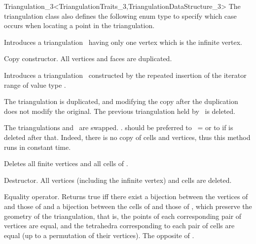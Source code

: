 \begin{ccRefClass}{Triangulation_3<TriangulationTraits_3,TriangulationDataStructure_3>}
The triangulation class also defines the following enum type to specify
which case occurs when locating a point in the triangulation. 

{}


\ccCreation
{}  %

\ccThreeToTwo

{Introduces a triangulation \ccVar\ having only one vertex which is the
infinite vertex.} 

{Copy constructor. All vertices and faces are duplicated.}

{Introduces a triangulation \ccVar\ constructed by the repeated insertion
of the iterator range \ccc{[first,last)} of value type .} 


{The triangulation  is duplicated, and modifying the copy after the 
duplication does not modify the original. The previous triangulation held
by \ccVar\ is deleted.}

{The triangulations  and \ccVar\ are swapped.
\ccVar. should be preferred to \ccVar\ =  or to
 if  is deleted after that. Indeed, there is no
copy of cells and vertices, thus this method runs in constant time.}

{Deletes all finite vertices and all cells of \ccVar.}

{Destructor. All vertices (including the infinite vertex) and cells are
deleted.}

{Equality operator.  Returns true iff there exist a bijection between the
vertices of  and those of  and a bijection between the cells of
 and those of , which preserve the geometry of the
triangulation, that is, the points of each corresponding pair of vertices are
equal, and the tetrahedra corresponding to each pair of cells are equal (up to
a permutation of their vertices).}
\ccGlue
{}
{The opposite of .}


\end{ccRefClass}
